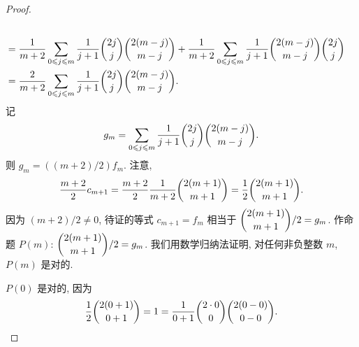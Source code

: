 \documentclass[../libro.tex]{subfiles}
\begin{document}
\begin{proof}
\begin{align*}
        \\
        = {} &
        \frac{1}{m+2} \sum_{0 \leq j \leq m} {
            \frac{1}{j+1} \dbinom{2j}{j} \dbinom{2(m-j)}{m-j}
        }
        + \frac{1}{m+2} \sum_{0 \leq j \leq m} {
            \frac{1}{j+1} \dbinom{2(m-j)}{m-j} \dbinom{2j}{j}
        }
        \\
        = {} &
        \frac{2}{m+2} \sum_{0 \leq j \leq m} {
            \frac{1}{j+1} \dbinom{2j}{j} \dbinom{2(m-j)}{m-j}
        }.
    \end{align*}
    记
    \begin{align*}
        g_m = \sum_{0 \leq j \leq m} {
            \frac{1}{j+1} \dbinom{2j}{j} \dbinom{2(m-j)}{m-j}
        }.
    \end{align*}
    则 \(g_m = ((m+2)/2) f_m\).
    注意,
    \begin{align*}
        \frac{m+2}{2} c_{m+1}
        = \frac{m+2}{2} \frac{1}{m+2} \dbinom{2(m+1)}{m+1}
        = \frac{1}{2} \dbinom{2(m+1)}{m+1}.
    \end{align*}
    因为 \((m+2)/2 \neq 0\),
    待证的等式 \(c_{m+1} = f_m\)
    相当于 \(\dbinom{2(m+1)}{m+1} / 2 = g_m\).
    作命题 \(P(m)\): \(\dbinom{2(m+1)}{m+1} / 2 = g_m\).
    我们用数学归纳法证明, 对任何非负整数 \(m\),
    \(P(m)\) 是对的.

    \(P(0)\) 是对的, 因为
    \begin{align*}
        \frac{1}{2} \dbinom{2 (0 + 1)}{0 + 1}
        = 1
        = \frac{1}{0+1}
        \dbinom{2 \cdot 0}{0} \dbinom{2 (0 - 0)}{0 - 0}.
    \end{align*}


\end{proof}
\end{document}
